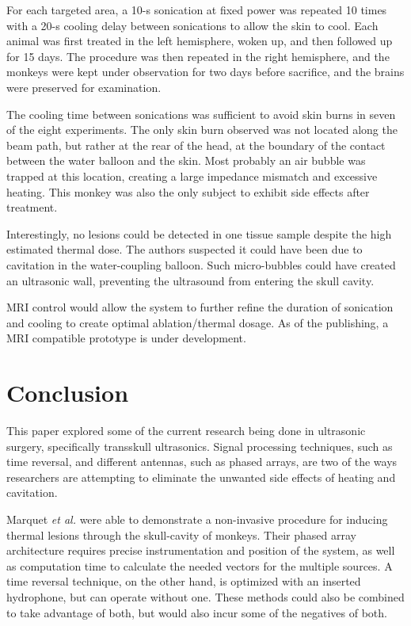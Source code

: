 \documentclass[letter,12pt,titlepage]{article}
\begin{document}
		For each targeted area, a 10-s sonication at fixed power was repeated 10 times with a 20-s cooling delay between sonications to allow the skin to cool. Each animal was first treated in the left hemisphere, woken up, and then followed up for 15 days. The procedure was then repeated in the right hemisphere, and the monkeys were kept under observation for two days before sacrifice, and the brains were preserved for examination. \cite{Marquet_2013}
		
		The cooling time between sonications was sufficient to avoid skin burns in seven of the eight experiments. The only skin burn observed was not located along the beam path, but rather at the rear of the head, at the boundary of the contact between the water balloon and the skin.  Most probably an air bubble was trapped at this location, creating a large impedance mismatch and excessive heating. This monkey was also the only subject to exhibit side effects after treatment. \cite{Marquet_2013}
		
		Interestingly, no lesions could be detected in one tissue sample despite the high estimated thermal dose. The authors suspected it could have been due to cavitation in the water-coupling balloon. Such micro-bubbles could have created an ultrasonic wall, preventing the ultrasound from entering the skull cavity. \cite{Marquet_2013}
		
		MRI control would allow the system to further refine the duration of sonication and cooling to create optimal ablation/thermal dosage.  As of the publishing, a MRI compatible prototype is under development. \cite{Marquet_2013}
		
\section{Conclusion}

	This paper explored some of the current research being done in ultrasonic surgery, specifically transskull ultrasonics. Signal processing techniques, such as time reversal, and different antennas, such as phased arrays, are two of the ways researchers are attempting to eliminate the unwanted side effects of heating and cavitation. 
	
	Marquet \textit{et al.} were able to demonstrate a non-invasive procedure for inducing thermal lesions through the skull-cavity of monkeys. Their phased array architecture requires precise instrumentation and position of the system, as well as computation time to calculate the needed vectors for the multiple sources. A time reversal technique, on the other hand, is optimized with an inserted hydrophone, but can operate without one. These methods could also be combined to take advantage of both, but would also incur some of the negatives of both.
	
\pagebreak		
\printbibliography
		
\end{document}
